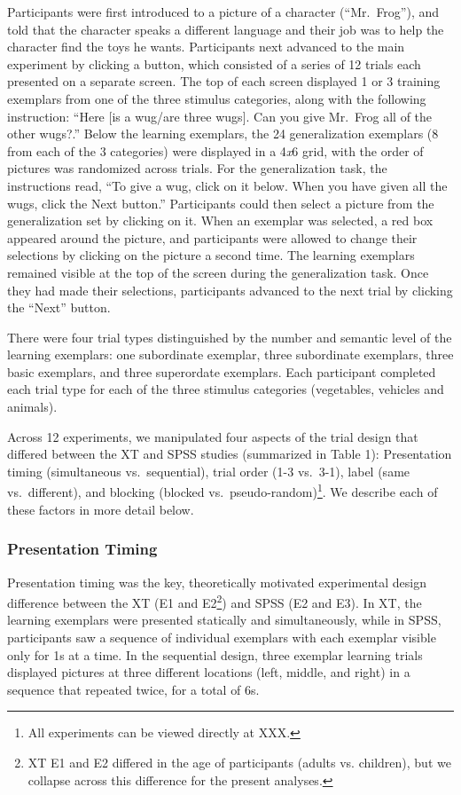 \documentclass[english,floatsintext,man]{apa6}
\theoremstyle{definition}
\theoremstyle{definition}
\theoremstyle{remark}
\begin{document}
Participants were first introduced to a picture of a character
(\enquote{Mr.~Frog}), and told that the character speaks a different
language and their job was to help the character find the toys he wants.
Participants next advanced to the main experiment by clicking a button,
which consisted of a series of 12 trials each presented on a separate
screen. The top of each screen displayed 1 or 3 training exemplars from
one of the three stimulus categories, along with the following
instruction: \enquote{Here {[}is a wug/are three wugs{]}. Can you give
Mr.~Frog all of the other wugs?.} Below the learning exemplars, the 24
generalization exemplars (8 from each of the 3 categories) were
displayed in a 4\emph{x}6 grid, with the order of pictures was
randomized across trials. For the generalization task, the instructions
read, \enquote{To give a wug, click on it below. When you have given all
the wugs, click the Next button.} Participants could then select a
picture from the generalization set by clicking on it. When an exemplar
was selected, a red box appeared around the picture, and participants
were allowed to change their selections by clicking on the picture a
second time. The learning exemplars remained visible at the top of the
screen during the generalization task. Once they had made their
selections, participants advanced to the next trial by clicking the
\enquote{Next} button.

There were four trial types distinguished by the number and semantic
level of the learning exemplars: one subordinate exemplar, three
subordinate exemplars, three basic exemplars, and three superordate
exemplars. Each participant completed each trial type for each of the
three stimulus categories (vegetables, vehicles and animals).

Across 12 experiments, we manipulated four aspects of the trial design
that differed between the XT and SPSS studies (summarized in Table 1):
Presentation timing (simultaneous vs.~sequential), trial order (1-3
vs.~3-1), label (same vs.~different), and blocking (blocked
vs.~pseudo-random)\footnote{All experiments can be viewed directly at XXX.}.
We describe each of these factors in more detail below.

\subsubsection{Presentation Timing}\label{presentation-timing}

Presentation timing was the key, theoretically motivated experimental
design difference between the XT (E1 and
E2\footnote{XT E1 and E2 differed in the age of participants (adults vs. children), but we collapse across this difference for the present analyses.})
and SPSS (E2 and E3). In XT, the learning exemplars were presented
statically and simultaneously, while in SPSS, participants saw a
sequence of individual exemplars with each exemplar visible only for 1s
at a time. In the sequential design, three exemplar learning trials
displayed pictures at three different locations (left, middle, and
right) in a sequence that repeated twice, for a total of 6s.
\end{document}
